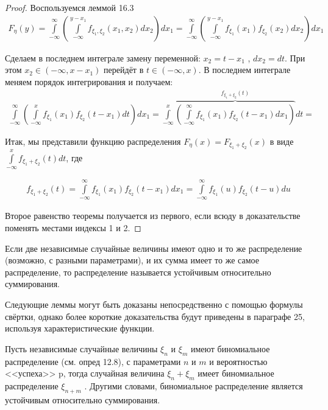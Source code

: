 \begin{proof}
Воспользуемся леммой 16.3
\begin{gather*}
	F_\eta (y) =
	\int\limits_{-\infty}^{\infty}\left(
		\int\limits_{-\infty}^{y-x_1 } f_{\xi_1,\xi_2} (x_1 , x_2 ) dx_2
	\right)dx_1=
	\int\limits_{-\infty}^{\infty}\left(
		\int\limits_{-\infty}^{y-x_1 } f_{\xi_1}(x_1)f_{\xi_2}(x_2) dx_2
	\right)dx_1
\end{gather*}

Сделаем в последнем интеграле замену переменной: $x_2 = t - x_1$ , $dx_2 = dt$.
При этом $x_2 \in (-\infty, x - x_1 )$ перейдёт в $t \in (-\infty, x)$. В последнем интеграле меняем порядок интегрирования и получаем:
\begin{gather*}
	\int\limits_{-\infty}^{\infty}\left(
		\int\limits_{-\infty}^{x} f_{\xi_1}(x_1)f_{\xi_2}(t-x_1) dt
	\right)dx_1=
	\int\limits_{-\infty}^{x}\overbrace{\left(
		\int\limits_{-\infty}^{\infty} f_{\xi_1}(x_1)f_{\xi_2}(t-x_1) dx_1
	\right)}^{f_{\xi_1+\xi_2}(t)}dt=
\end{gather*}

Итак, мы представили функцию распределения $F_\eta (x) = F_{\xi_1 +\xi_2} (x)$ в виде $\int\limits_{-\infty}^{x} f_{\xi_1 +\xi_2} (t) dt$, где

\begin{gather*}
	f_{\xi_1 +\xi_2} (t)=\int\limits_{-\infty}^{\infty} f_{\xi_1}(x_1)f_{\xi_2}(t-x_1) dx_1=\int\limits_{-\infty}^{\infty} f_{\xi_1}(u)f_{\xi_2}(t-u) du
\end{gather*}

Второе равенство теоремы получается из первого, если всюду в доказательстве поменять местами индексы 1 и 2.
\end{proof}

\begin{definition}
\label{def:16.7}
Если две независимые случайные величины имеют одно и то же распределение (возможно, с разными параметрами), и их сумма имеет то же самое распределение, то распределение называется устойчивым относительно суммирования.
\end{definition}

\begin{zam}
\label{zam:16.8}
Следующие леммы могут быть доказаны непосредственно с помощью формулы свёртки, однако более короткие доказательства будут приведены в параграфе 25, используя характеристические функции.
\end{zam}

\begin{lemma}
\label{lemma:16.9}
	Пусть независимые случайные величины $\xi_n$ и $\xi_m$ имеют
биномиальное распределение (см. опред 12.8), с параметрами $n$ и $m$ и вероятностью <<успеха>>  p, тогда случайная величина $\xi_n + \xi_m$ имеет биномиальное распределение $\xi_{n+m}$ . Другими словами, биномиальное распределение является устойчивым относительно суммирования.
\end{lemma}

